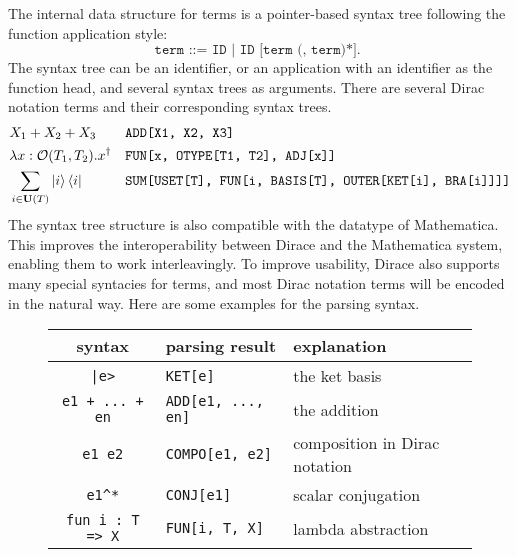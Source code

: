 \documentclass[runningheads]{llncs}
\begin{document}
The internal data structure for terms is a pointer-based syntax tree following the function application style:
\[
    \texttt{
        term ::= ID | ID [term (, term)*].
    }
\]
The syntax tree can be an identifier, or an application with an identifier as the function head, and several syntax trees as arguments. There are several Dirac notation terms and their corresponding syntax trees.
\footnotesize{
\begin{align*}
    & X_1 + X_2 + X_3 && \texttt{ADD[X1, X2, X3]} 
    \\
    & \lambda x: \mathcal{O}(T_1,  T_2). x^\dagger && \texttt{FUN[x, OTYPE[T1, T2], ADJ[x]]}
    \\
    & \sum_{i \in \mathbf{U}(T)} \ket{i} \bra{i} && \texttt{SUM[USET[T], FUN[i, BASIS[T], OUTER[KET[i], BRA[i]]]]}
\end{align*}
}
The syntax tree structure is also compatible with the datatype of Mathematica. This improves the interoperability between Dirace and the Mathematica system, enabling them to work interleavingly.
To improve usability, Dirace also supports many special syntacies for terms,  and most Dirac notation terms will be encoded in the natural way.
Here are some examples for the parsing syntax.

\begin{figure}
    \center
\begin{tabular}{c >{\centering\arraybackslash}p{4cm} l}
    \hline
    syntax & parsing result & explanation \\
    \hline
    \texttt{|e>} & \texttt{KET[e]} & the ket basis\\
    \texttt{e1 + ... + en} & \texttt{ADD[e1, ..., en]} & the addition\\
    \texttt{e1\ e2} & \texttt{COMPO[e1, e2]} & composition in Dirac notation \\
    \texttt{e1\^{}*} & \texttt{CONJ[e1]} & scalar conjugation \\
    \texttt{fun i : T => X} & \texttt{FUN[i, T, X]} & lambda abstraction \\
    \hline
\end{tabular}
\end{figure}
\end{document}
